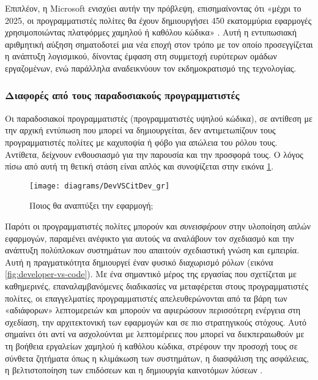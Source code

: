                 Επιπλέον, η Microsoft ενισχύει αυτήν την πρόβλεψη, επισημαίνοντας ότι «μέχρι το 2025, οι προγραμματιστές πολίτες θα έχουν δημιουργήσει 450 εκατομμύρια εφαρμογές χρησιμοποιώντας πλατφόρμες χαμηλού ή καθόλου κώδικα» \cite{cnbcNextFrontier}. Αυτή η εντυπωσιακή αριθμητική αύξηση σηματοδοτεί μια νέα εποχή στον τρόπο με τον οποίο προσεγγίζεται η ανάπτυξη λογισμικού, δίνοντας έμφαση στη συμμετοχή ευρύτερων ομάδων εργαζομένων, ενώ παράλληλα αναδεικνύουν τον εκδημοκρατισμό της τεχνολογίας.

                \subsubsection{Διαφορές από τους παραδοσιακούς προγραμματιστές}
                    Οι παραδοσιακοί προγραμματιστές (προγραμματιστές υψηλού κώδικα), σε αντίθεση με την αρχική εντύπωση που μπορεί να δημιουργείται, δεν αντιμετωπίζουν τους προγραμματιστές πολίτες με καχυποψία ή φόβο για απώλεια του ρόλου τους. Αντίθετα, δείχνουν ενθουσιασμό για την παρουσία και την προσφορά τους. Ο λόγος πίσω από αυτή τη θετική στάση είναι απλός και συνοψίζεται στην εικόνα \ref{fig:DevVSCitDev}.

                    \begin{figure}[h!] \noindent \centering
                        \texttt{[image: diagrams/DevVSCitDev\_gr]}
                        \caption{Ποιος θα αναπτύξει την εφαρμογή; \cite{LowCodeSimon}}
                        \label{fig:DevVSCitDev}
                    \end{figure}

                    Παρότι οι προγραμματιστές πολίτες μπορούν και \textit{συνεισφέρουν} στην υλοποίηση απλών εφαρμογών, παραμένει ανέφικτο για αυτούς να αναλάβουν τον σχεδιασμό και την ανάπτυξη πολύπλοκων συστημάτων που απαιτούν σχεδιαστική γνώση και εμπειρία. Αυτή η πραγματικότητα δημιουργεί έναν φυσικό διαχωρισμό ρόλων (εικόνα \ref{fig:developer-vs-code}). Με ένα σημαντικό μέρος της εργασίας που σχετίζεται με καθημερινές, επαναλαμβανόμενες διαδικασίες να μεταφέρεται στους προγραμματιστές πολίτες, οι επαγγελματίες προγραμματιστές απελευθερώνονται από τα βάρη των «αδιάφορων» λεπτομερειών και μπορούν να αφιερώσουν περισσότερη ενέργεια στη σχεδίαση, την αρχιτεκτονική των εφαρμογών και σε πιο στρατηγικούς στόχους. Αυτό σημαίνει ότι αντί να ασχολούνται με λεπτομέρειες που μπορεί να διεκπεραιωθούν με τη βοήθεια εργαλείων χαμηλού ή καθόλου κώδικα, στρέφουν την προσοχή τους σε σύνθετα ζητήματα όπως η κλιμάκωση των συστημάτων, η διασφάλιση της ασφάλειας, η βελτιστοποίηση των επιδόσεων και η δημιουργία καινοτόμων λύσεων \cite{Sahay2020}.

